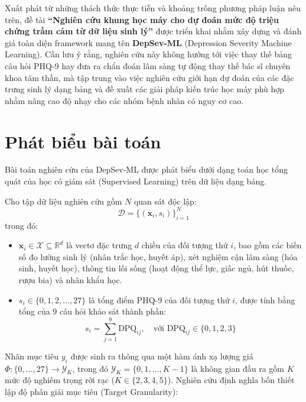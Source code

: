 Xuất phát từ những thách thức thực tiễn và khoảng trống phương pháp luận nêu trên, đề tài \textbf{“Nghiên cứu khung học máy cho dự đoán mức độ triệu chứng trầm cảm từ dữ liệu sinh lý”} được triển khai nhằm xây dựng và đánh giá toàn diện framework mang tên \textbf{DepSev-ML} (Depression Severity Machine Learning). Cần lưu ý rằng, nghiên cứu này không hướng tới việc thay thế bảng câu hỏi PHQ-9 hay đưa ra chẩn đoán lâm sàng tự động thay thế bác sĩ chuyên khoa tâm thần, mà tập trung vào việc nghiên cứu giới hạn dự đoán của các đặc trưng sinh lý dạng bảng và đề xuất các giải pháp kiến trúc học máy phù hợp nhằm nâng cao độ nhạy cho các nhóm bệnh nhân có nguy cơ cao.

\section{Phát biểu bài toán}
\label{sec:phat-bieu-bai-toan}

Bài toán nghiên cứu của DepSev-ML được phát biểu dưới dạng toán học tổng quát của học có giám sát (Supervised Learning) trên dữ liệu dạng bảng.

Cho tập dữ liệu nghiên cứu gồm $N$ quan sát độc lập:
\begin{equation}
    \mathcal{D} = \{(\mathbf{x}_i, s_i)\}_{i=1}^N
\end{equation}
trong đó:
\begin{itemize}
    \item $\mathbf{x}_i \in \mathcal{X} \subseteq \mathbb{R}^d$ là vectơ đặc trưng $d$ chiều của đối tượng thứ $i$, bao gồm các biến số đo lường sinh lý (nhân trắc học, huyết áp), xét nghiệm cận lâm sàng (hóa sinh, huyết học), thông tin lối sống (hoạt động thể lực, giấc ngủ, hút thuốc, rượu bia) và nhân khẩu học.
    \item $s_i \in \{0, 1, 2, \dots, 27\}$ là tổng điểm PHQ-9 của đối tượng thứ $i$, được tính bằng tổng của 9 câu hỏi khảo sát thành phần:
    \begin{equation}
        s_i = \sum_{j=1}^9 \text{DPQ}_{ij}, \quad \text{với } \text{DPQ}_{ij} \in \{0, 1, 2, 3\}
    \end{equation}
\end{itemize}

Nhãn mục tiêu $y_i$ được sinh ra thông qua một hàm ánh xạ lượng giá $\Phi: \{0, \dots, 27\} \to \mathcal{Y}_K$, trong đó $\mathcal{Y}_K = \{0, 1, \dots, K-1\}$ là không gian đầu ra gồm $K$ mức độ nghiêm trọng rời rạc ($K \in \{2, 3, 4, 5\}$). Nghiên cứu định nghĩa bốn thiết lập độ phân giải mục tiêu (Target Granularity):

